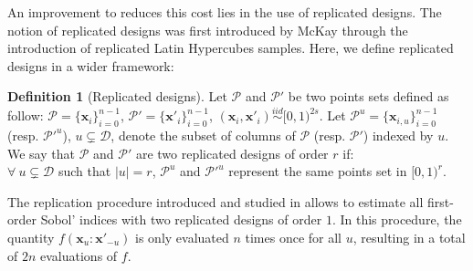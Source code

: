 \documentclass[]{elsarticle}
\theoremstyle{definition}
\newtheorem{defin}{Definition}
\newcommand{\bvec}[1]{\boldsymbol{#1}}
\newcommand{\vx}{\bvec{x}}
\begin{document}
An improvement to reduces this cost lies in the use of replicated designs. The notion of replicated designs was first introduced by McKay \cite{mckay} through the introduction of replicated Latin Hypercubes samples. Here, we define replicated designs in a wider framework:
\begin{defin}[Replicated designs]
Let $\mathcal{P}$ and $\mathcal{P}'$ be two points sets defined as follow:
$\mathcal{P}=\{\vx_i\}_{i=0}^{n-1}$, $\mathcal{P}'=\{{\vx'}_i\}_{i=0}^{n-1}$, $(\vx_i,\vx'_i) \stackrel{iid}{\sim} [0,1)^{2s}$. Let $\mathcal{P}^u=\{\vx_{i,u}\}_{i=0}^{n-1}$ (resp. $\mathcal{P}'^u$), $u \subsetneq \mathcal{D}$, denote the subset of columns of $\mathcal{P}$ (resp. $\mathcal{P}'$) indexed by $u$. We say that $\mathcal{P}$ and $\mathcal{P}'$ are two replicated designs of order $r$ if:\\
$\forall \ u \subsetneq \mathcal{D}$ such that $|u|=r$, $\mathcal{P}^u$ and $\mathcal{P}'^u$ represent the same points set in $[0,1)^r$.
\end{defin}
The replication procedure introduced and studied in \cite{mara,tissot} allows to estimate all first-order Sobol' indices with two replicated designs of order $1$. In this procedure, the quantity $f(\vx_u:{\vx'}_{-u})$ is only evaluated $n$ times once for all $u$, resulting in a total of $2n$ evaluations of $f$. %
\end{document}
